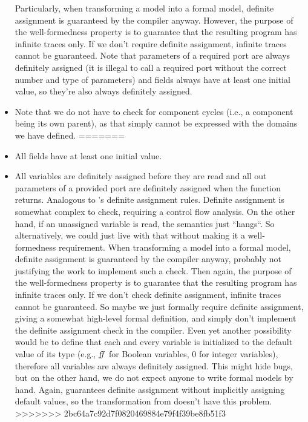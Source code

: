 \documentclass[a4paper,10pt,english]{article}
\begin{document}
\begin{itemize}
	Particularly, when transforming a \SSharp model into a formal model, definite assignment is guaranteed by the \CSharp compiler
	anyway. However, the purpose of the well-formedness property is to guarantee that the resulting \Fil program
	has infinite traces only. If we don't require definite assignment, infinite traces cannot be guaranteed. Note that parameters
	of a required port are always definitely assigned (it is illegal to call a required port without the correct number and type of
	parameters) and fields always have at least one initial value, so they're also always definitely assigned.
	\item Note that we do not have to check for component cycles (i.e., a component being its own parent), as that simply cannot be
	expressed with the domains we have defined.
=======
	\item All fields have at least one initial value.
	\item All variables are definitely assigned before they are read and all out parameters of a provided port are definitely
	assigned when the function returns. Analogous to \CSharp's definite assignment rules. Definite assignment is somewhat complex to
	check, requiring a control flow analysis. On the other hand, if an unassigned variable is read, the semantics just ``hangs``.
	So alternatively, we could just live with that without making it a well-formedness requirement. When transforming a \SSharp
	model into a formal model, definite assignment is guaranteed by the \CSharp compiler anyway, probably not justifying the work to
	implement such a check. Then again, the purpose of the well-formedness property is to guarantee that the resulting \Fil program
	has infinite traces only. If we don't check definite assignment, infinite traces cannot be guaranteed. So maybe we just formally
	require definite assignment, giving a somewhat high-level formal definition, and simply don't implement the definite assignment
	check in the \SSharp compiler. Even yet another possibility would be to define that each and every variable is initialized to the
	default value of its type (e.g., $\mathit{ff}$ for Boolean variables, $0$ for integer variables), therefore all variables are always
	definitely assigned. This might hide bugs, but on the other hand, we do not expect anyone to write formal models by hand. Again,
	\CSharp guarantees definite assignment without implicitly assigning default values, so the transformation from \CSharp doesn't
	have this problem.
>>>>>>> 2bc64a7c92d7f0820469884e79f4f39be8fb51f3
\end{itemize}
\end{document}
